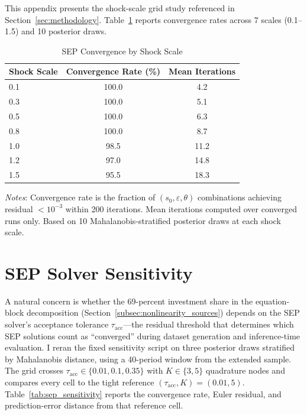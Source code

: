 \documentclass[12pt]{article}
\theoremstyle{plain}
\theoremstyle{definition}
\theoremstyle{remark}
\newcommand{\tablenotes}[1]{%
  \par\vspace{0.5em}%
  \noindent\begin{minipage}{\textwidth}%
  \raggedright\footnotesize #1%
  \end{minipage}\par%
}
\begin{document}
This appendix presents the shock-scale grid study referenced in Section~\ref{sec:methodology}. Table~\ref{tab:shock_scale_grid} reports convergence rates across 7 scales (0.1--1.5) and 10 posterior draws.

\begin{table}[htbp]
\centering
\caption{SEP Convergence by Shock Scale}
\label{tab:shock_scale_grid}
\begin{tabular}{lcc}
\toprule
Shock Scale & Convergence Rate (\%) & Mean Iterations \\
\midrule
0.1 & 100.0 & 4.2 \\
0.3 & 100.0 & 5.1 \\
0.5 & 100.0 & 6.3 \\
0.8 & 100.0 & 8.7 \\
1.0 & 98.5 & 11.2 \\
1.2 & 97.0 & 14.8 \\
1.5 & 95.5 & 18.3 \\
\bottomrule
\end{tabular}
\smallskip
\tablenotes{\textit{Notes}: Convergence rate is the fraction of $(s_0, \varepsilon, \theta)$ combinations achieving residual $< 10^{-3}$ within 200 iterations. Mean iterations computed over converged runs only. Based on 10 Mahalanobis-stratified posterior draws at each shock scale.}
\end{table}


\section{SEP Solver Sensitivity}
\label{app:sep_sensitivity}

A natural concern is whether the 69-percent investment share in the equation-block decomposition (Section~\ref{subsec:nonlinearity_sources}) depends on the SEP solver's acceptance tolerance $\tau_{\text{acc}}$---the residual threshold that determines which SEP solutions count as ``converged'' during dataset generation and inference-time evaluation. I reran the fixed sensitivity script on three posterior draws stratified by Mahalanobis distance, using a 40-period window from the extended sample. The grid crosses $\tau_{\text{acc}} \in \{0.01, 0.1, 0.35\}$ with $K \in \{3,5\}$ quadrature nodes and compares every cell to the tight reference $(\tau_{\text{acc}},K)=(0.01,5)$.
Table~\ref{tab:sep_sensitivity} reports the convergence rate, Euler residual, and prediction-error distance from that reference cell.


\end{document}
